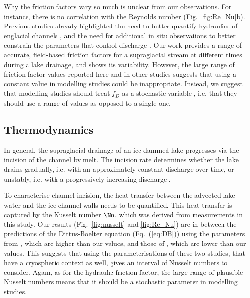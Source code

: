 Why the friction factors vary so much is unclear from our observations. For instance, there is no correlation with the Reynolds number (Fig.~\ref{fig:Re_Nu}b). Previous studies already highlighted the need to better quantify hydraulics of englacial channels \citep[e.g.][]{Clarke2003, Gleason&al2016}, and the need for additional in situ observations to better constrain the parameters that control  discharge \citep[e.g.][]{Kingslake&al2015, Smith&al2015}. Our work provides a range of accurate, field-based friction factors for a supraglacial stream at different times during a lake drainage, and shows its variability.
%
However, the large range of friction factor values reported here and in other studies suggests that using a constant value in modelling studies could be inappropriate.
Instead, we suggest that modelling studies should treat $f_D$ as a stochastic variable \citep[e.g.][]{Brinkerhoff&al2021,Irarrazaval&al2021}, i.e. that they should use a range of values as opposed to a single one.

\subsection{Thermodynamics}

In general, the supraglacial drainage of an ice-dammed lake progresses via the incision of the channel by melt. The incision rate determines whether the lake drains gradually, i.e. with an approximately constant discharge over time, or unstably, i.e. with a progressively increasing discharge \citep{Raymond&Nolan2000}.

To characterise channel incision, the heat transfer between the advected lake water and the ice channel walls needs to be quantified.  This heat transfer is captured by the Nusselt number $\Nu$, which was derived from measurements in this study. Our results (Fig.~\ref{fig:nusselt} and \ref{fig:Re_Nu}) are in-between the predictions of the Dittus-Boelter equation (Eq.~(\ref{eq:DB})) using the parameters from \cite{Vincent&al2010}, which are higher than our values, and those of \cite{Lunardini&al1986}, which are lower than our values.
This suggests that using the parameterisations of these two studies, that have a cryospheric context as well, gives an interval of Nusselt numbers to consider.  Again, as for the hydraulic friction factor, the large range of plausible Nusselt numbers means that it should be a stochastic parameter in modelling studies.

